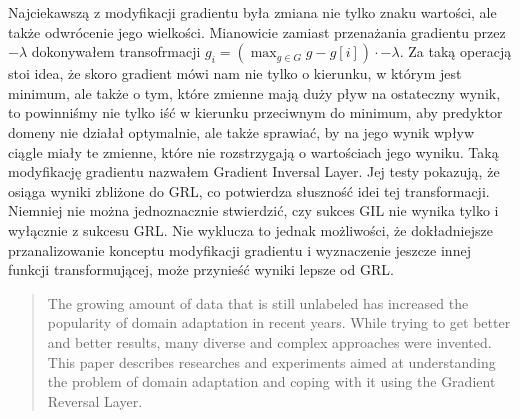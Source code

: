 \documentclass{article}
\begin{document}
Najciekawszą z modyfikacji gradientu była zmiana nie tylko znaku wartości, ale także odwrócenie jego wielkości. Mianowicie zamiast przenażania gradientu przez $-\lambda$ dokonywałem transofrmacji $g_{i} = (\max_{g \in G} g - g[i]) \cdot -\lambda$. Za taką operacją stoi idea, że skoro gradient mówi nam nie tylko o kierunku, w którym jest minimum, ale także o tym, które zmienne mają duży pływ na ostateczny wynik, to powinniśmy nie tylko iść w kierunku przeciwnym do minimum, aby predyktor domeny nie działał optymalnie, ale także sprawiać, by na jego wynik wpływ ciągle miały te zmienne, które nie rozstrzygają o wartościach jego wyniku. Taką modyfikację gradientu nazwałem Gradient Inversal Layer. Jej testy pokazują, że osiąga wyniki zbliżone do GRL, co potwierdza słuszność idei tej transformacji. Niemniej nie można jednoznacznie stwierdzić, czy sukces GIL nie wynika tylko i wyłącznie z sukcesu GRL. Nie wyklucza to jednak możliwości, że dokładniejsze przanalizowanie konceptu modyfikacji gradientu i wyznaczenie jeszcze innej funkcji transformującej, może przynieść wyniki lepsze od GRL.

\begin{abstract}
The growing amount of data that is still unlabeled has increased the popularity of domain adaptation in recent years. While trying to get better and better results, many diverse and complex approaches were invented. This paper describes researches and experiments aimed at understanding the problem of domain adaptation and coping with it using the Gradient Reversal Layer.
\end{abstract}
\end{document}
